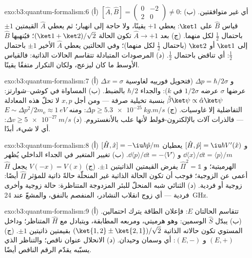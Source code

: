 \begin{solution}{exo:b3:quantum-formalism:6}
(أ) $[\hat A, \hat B] = \begin{pmatrix}0 & -2\\ 2 & 0\end{pmatrix}
\neq 0$: أي غير متوافقتين. (ب) قياس $\hat B$ على $\ket1$: يعطي $+1$
يقينًا، ولا حاجة إلى انهيار؛ ثم يعطي $\hat A$ القيمتين $\pm1$
باحتمال $\tfrac12$ لكل منهما. (ج) بعد $\hat A \to +1$ تكون الحالة
$(\ket1 + \ket2)/\sqrt2$؛ فيُنهيها $\hat B$ إلى $\ket1$ أو
$\ket2$ (باحتمال $\tfrac12$ لكل منهما)؛ وفي الحالتين يعطي $\hat A$ الأخير
$\pm1$ باحتمال $\tfrac12$: أي تناقض باحتمال
$\tfrac12$. (د) المرصودات المتبادلة تتقاسم الحالات الذاتية: فالقياس
الأوسط ما كان ليزعج، ولكان التكرار متفقًا
يقينًا.
\end{solution}

\begin{solution}{exo:b3:quantum-formalism:7}
(أ) $\Delta x = \sigma$ و $\Delta p = \hbar/2\sigma$ (فتحويل فورييه
لغاوسية عرضها $\sigma$ عرضه $1/2\sigma$ في
$k$): والجداء $\hbar/2$ بالضبط. (ب) المساواة في كوشي--شوارتز:
$\hat\beta\ket\psi \propto \hat\alpha\ket\psi$ بنسبة تخيلية
صرفة --- ومن أجل $x, p$ لا تحلّ هذه المعادلة التفاضلية إلا
غاوسيات. (ج) $\Delta p \ge \qty{5.3e-25}{kg.m/s}$: ومنه $E \sim
\Delta p^2/2m_{\text{e}} \approx \qty{1}{eV}$ --- فالذرات آلات
بالإلكترون-فولط لأنها علب بالأنغستروم. (د)
$\Delta v \ge \qty{5e-27}{m/s}$: أي لا شيء، أبدًا.
\end{solution}

\begin{solution}{exo:b3:quantum-formalism:8}
(أ) $[\hat H, \hat x] = -\iu\hbar\hat p/m$ و $[\hat H, \hat p] =
\iu\hbar V'(\hat x)$ يعطيان $\dd\langle x\rangle/\dd t = \langle
p\rangle/m$ و $\dd\langle p\rangle/\dd t = -\langle V'\rangle$. (ب)
تغيير المتغير في الجداء الداخلي يُظهر الهرميتية؛
و $\hat\Pi^2 = \mathbb 1$ يفرض القيمتين الذاتيتين $\pm1$. (ج) $V(-x) =
V(x)$ يجعل $\hat H$ أعمى عن الزوجية؛ فوجب أن تكون الحالة الذاتية غير المنحلّة
حالةً ذاتية للمؤثر $\hat\Pi$ أيضًا: زوجية أو فردية. (د)
الثنائي شبه المنحلّ للبئر المزدوجة المتناظرة: حالة زوجية وأخرى
فردية --- أي زوج انقلاب النشادر، المنفصم بالنفق، والمشعّ
عند \qty{24}{GHz}.
\end{solution}

\begin{solution}{exo:b3:quantum-formalism:9}
(أ) تتقاسم الحالتان $E$: فإعلان الطاقة يترك
احتمالين. (ب) يبدّل $\hat S$ الوسمين: وهو هرميتي، ومربعه
المطابقة، ويتبادل مع $\hat H$ المتناظر؛ وداخل المستوي تكون
حالاته الذاتية $(\ket{1,2} \pm \ket{2,1})/\sqrt2$ بقيمتين ذاتيتين
$\pm1$. (ج) $(E, +)$ و $(E, -)$: أي وسمان وحيدان. (د) الانحلال
عنوان ناقص؛ والتناظر الذي يسبّبه يقدّم
الرقم الناقص أيضًا.
\end{solution}

